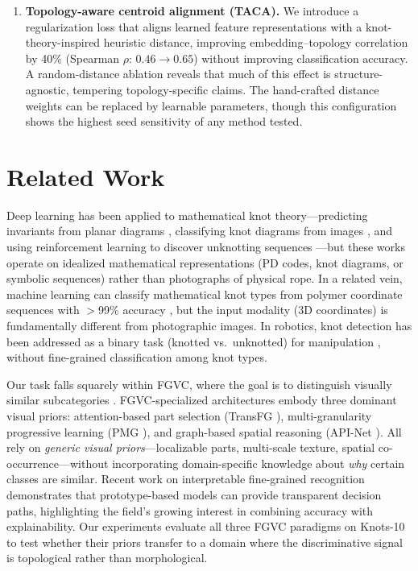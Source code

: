 \documentclass[preprint,review,12pt]{elsarticle}
\begin{document}
\begin{enumerate}
    \item \textbf{Topology-aware centroid alignment (TACA).} We introduce a regularization loss that aligns learned feature representations with a knot-theory-inspired heuristic distance, improving embedding--topology correlation by 40\% (Spearman $\rho$: $0.46 \to 0.65$) without improving classification accuracy. A random-distance ablation reveals that much of this effect is structure-agnostic, tempering topology-specific claims. The hand-crafted distance weights can be replaced by learnable parameters, though this configuration shows the highest seed sensitivity of any method tested.
\end{enumerate}

\section{Related Work}
\label{sec:related}

Deep learning has been applied to mathematical knot theory---predicting invariants from planar diagrams \citep{hughes2020neural, craven2024illuminating, gukov2024rigor}, classifying knot diagrams from images \citep{knotdetection2025}, and using reinforcement learning to discover unknotting sequences \citep{applebaum2025unknotting}---but these works operate on idealized mathematical representations (PD codes, knot diagrams, or symbolic sequences) rather than photographs of physical rope. In a related vein, machine learning can classify mathematical knot types from polymer coordinate sequences with $>$99\% accuracy \citep{vandans2020knots}, but the input modality (3D coordinates) is fundamentally different from photographic images. In robotics, knot detection has been addressed as a binary task (knotted vs.\ unknotted) for manipulation \citep{sundaresan2020, grannen2020}, without fine-grained classification among knot types.

Our task falls squarely within FGVC, where the goal is to distinguish visually similar subcategories \citep{wei2022fgia}. FGVC-specialized architectures embody three dominant visual priors: attention-based part selection (TransFG \citep{he2022transfg}), multi-granularity progressive learning (PMG \citep{du2020pmg}), and graph-based spatial reasoning (API-Net \citep{zhuang2020apinet}). All rely on \emph{generic visual priors}---localizable parts, multi-scale texture, spatial co-occurrence---without incorporating domain-specific knowledge about \emph{why} certain classes are similar. Recent work on interpretable fine-grained recognition \citep{nauta2021prototree} demonstrates that prototype-based models can provide transparent decision paths, highlighting the field's growing interest in combining accuracy with explainability. Our experiments evaluate all three FGVC paradigms on Knots-10 to test whether their priors transfer to a domain where the discriminative signal is topological rather than morphological.
\end{document}
